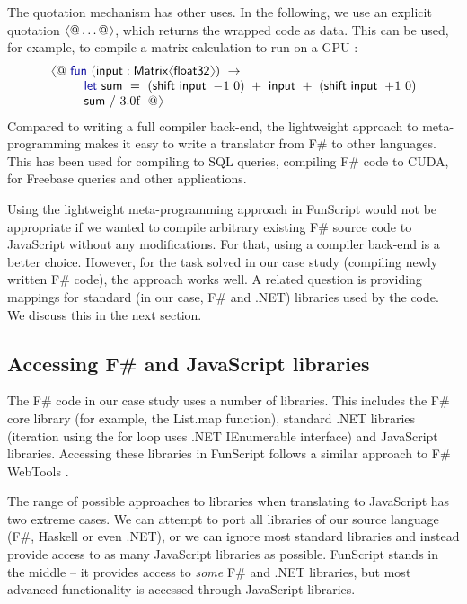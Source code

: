\documentclass[submission,copyright,creativecommons]{eptcs}
\newcommand{\langl}{\begin{picture}(4.5,7)
\put(1.1,2.5){\rotatebox{60}{\line(1,0){5.5}}}
\put(1.1,2.5){\rotatebox{300}{\line(1,0){5.5}}}
\end{picture}}
\newcommand{\rangl}{\begin{picture}(4.5,7)
\put(.9,2.5){\rotatebox{120}{\line(1,0){5.5}}}
\put(.9,2.5){\rotatebox{240}{\line(1,0){5.5}}}
\end{picture}}
\newcommand{\kvd}[1]{\textnormal{\textcolor{kvdclr}{\sffamily #1}}}
\newcommand{\ident}[1]{\textnormal{\sffamily #1}}
\begin{document}
The quotation mechanism has other uses. In the following, we use an explicit quotation $\langl @ \ldots @\rangl$,
which returns the wrapped code as data. This can be used, for example, to compile a matrix calculation
to run on a GPU \cite{accelerator}:
%
\begin{equation*}
\begin{array}{l}
 \langl @~ \kvd{fun}~(\ident{input}:\ident{Matrix}\langl\ident{float32}\rangl)~\rightarrow \\
 \qquad~~ \kvd{let}~\ident{sum}~=~(\ident{shift input}~-\hspace{-0.2em}1~0) ~+~ \ident{input} ~+~ (\ident{shift input}~+\hspace{-0.2em}1~0) \\
 \qquad~~ \ident{sum}~/~3.0\textnormal{f}~~@\rangl
\end{array}
\end{equation*}
%
Compared to writing a full compiler back-end, the lightweight approach to meta-programming makes it easy to
write a translator from F\# to other languages. This has been used for compiling to SQL queries, compiling
F\# code to CUDA, for Freebase queries \cite{fsharp-data} and other applications.

Using the lightweight meta-programming approach in FunScript would not be appropriate if we wanted to
compile arbitrary existing F\# source code to JavaScript without any modifications. For that, using a
compiler back-end is a better choice. However, for the task solved in our case study (compiling
newly written F\# code), the approach works well. A related question is providing mappings for
standard (in our case, F\# and .NET) libraries used by the code. We discuss this in the next section.

\subsection{Accessing F\# and JavaScript libraries}
\label{sec:js-lib}

The F\# code in our case study uses a number of libraries. This includes the F\# core library (for
example, the \ident{List.map} function), standard .NET libraries (iteration using the \kvd{for} loop
uses .NET \ident{IEnumerable} interface) and JavaScript libraries. Accessing these libraries in
FunScript follows a similar approach to F\# WebTools \cite{fsharp-webtools}.

The range of possible approaches to libraries when translating to JavaScript has two extreme cases.
We can attempt to port all libraries of our source language (F\#, Haskell or even .NET), or we
can ignore most standard libraries and instead provide access to as many JavaScript libraries as
possible. FunScript stands in the middle -- it provides access to \emph{some} F\# and .NET libraries,
but most advanced functionality is accessed through JavaScript libraries.
\end{document}

